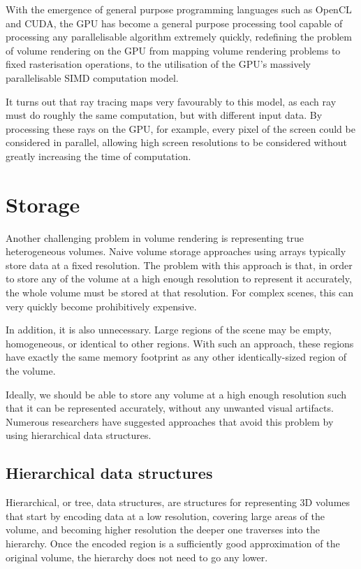 With the emergence of general purpose programming languages such as OpenCL and CUDA, the GPU has become a general purpose processing tool capable of processing any parallelisable algorithm extremely quickly, redefining the problem of volume rendering on the GPU from mapping volume rendering problems to fixed rasterisation operations, to the utilisation of the GPU's massively parallelisable SIMD computation model.

It turns out that ray tracing maps very favourably to this model, as each ray must do roughly the same computation, but with different input data. By processing these rays on the GPU, for example, every pixel of the screen could be considered in parallel, allowing high screen resolutions to be considered without greatly increasing the time of computation.

\section{Storage}
Another challenging problem in volume rendering is representing true heterogeneous volumes. Naive volume storage approaches using arrays typically store data at a fixed resolution. The problem with this approach is that, in order to store any of the volume at a high enough resolution to represent it accurately, the whole volume must be stored at that resolution. For complex scenes, this can very quickly become prohibitively expensive.

In addition, it is also unnecessary. Large regions of the scene may be empty, homogeneous, or identical to other regions. With such an approach, these regions have exactly the same memory footprint as any other identically-sized region of the volume.

Ideally, we should be able to store any volume at a high enough resolution such that it can be represented accurately, without any unwanted visual artifacts. Numerous researchers have suggested approaches that avoid this problem by using hierarchical data structures.

\subsection{Hierarchical data structures}
Hierarchical, or tree, data structures, are structures for representing 3D volumes that start by encoding data at a low resolution, covering large areas of the volume, and becoming higher resolution the deeper one traverses into the hierarchy. Once the encoded region is a sufficiently good approximation of the original volume, the hierarchy does not need to go any lower.

